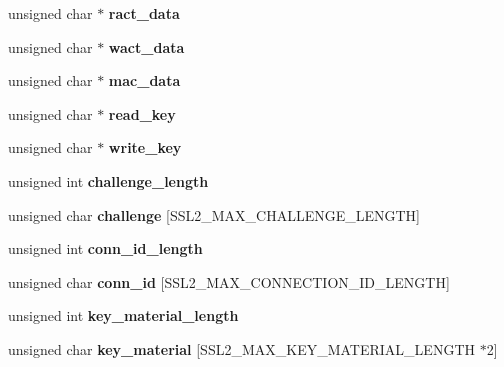 \begin{DoxyCompactItemize}
unsigned char $\ast$ {\bfseries ract\+\_\+data}
\item 
\mbox{\label{structssl2__state__st_a356c1be4239c904d8ae8029d00c67f9c}} 
unsigned char $\ast$ {\bfseries wact\+\_\+data}
\item 
\mbox{\label{structssl2__state__st_a9416e79c8eea6411034877fb17d2753e}} 
unsigned char $\ast$ {\bfseries mac\+\_\+data}
\item 
\mbox{\label{structssl2__state__st_aeee9913d4be0f5c9ceb2cecf2138fed0}} 
unsigned char $\ast$ {\bfseries read\+\_\+key}
\item 
\mbox{\label{structssl2__state__st_aa4740a68be06f6fe8b469869a3080dda}} 
unsigned char $\ast$ {\bfseries write\+\_\+key}
\item 
\mbox{\label{structssl2__state__st_a7f563915cbb84b32c5f96cb7e4838998}} 
unsigned int {\bfseries challenge\+\_\+length}
\item 
\mbox{\label{structssl2__state__st_aceaded62c7097ab2f7b6f3c2c0650d03}} 
unsigned char {\bfseries challenge} \mbox{[}S\+S\+L2\+\_\+\+M\+A\+X\+\_\+\+C\+H\+A\+L\+L\+E\+N\+G\+E\+\_\+\+L\+E\+N\+G\+TH\mbox{]}
\item 
\mbox{\label{structssl2__state__st_a802704a6566f2d30dcba9c39b00b98b6}} 
unsigned int {\bfseries conn\+\_\+id\+\_\+length}
\item 
\mbox{\label{structssl2__state__st_ae3f7008cf3a56bdb8555e91cf4c0b9d0}} 
unsigned char {\bfseries conn\+\_\+id} \mbox{[}S\+S\+L2\+\_\+\+M\+A\+X\+\_\+\+C\+O\+N\+N\+E\+C\+T\+I\+O\+N\+\_\+\+I\+D\+\_\+\+L\+E\+N\+G\+TH\mbox{]}
\item 
\mbox{\label{structssl2__state__st_a27ac33d76f88e922c9e3a3db0f4660c0}} 
unsigned int {\bfseries key\+\_\+material\+\_\+length}
\item 
\mbox{\label{structssl2__state__st_a32726d50cdce6e7de2b5734b77b92ab9}} 
unsigned char {\bfseries key\+\_\+material} \mbox{[}S\+S\+L2\+\_\+\+M\+A\+X\+\_\+\+K\+E\+Y\+\_\+\+M\+A\+T\+E\+R\+I\+A\+L\+\_\+\+L\+E\+N\+G\+TH $\ast$2\mbox{]}

\end{DoxyCompactItemize}
